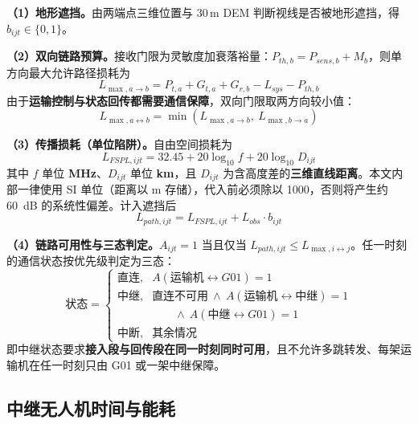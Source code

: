 \textbf{（1）地形遮挡。}由两端点三维位置与 30\,m DEM 判断视线是否被地形遮挡，得 $b_{ijt}\in\{0,1\}$。

\textbf{（2）双向链路预算。}接收门限为灵敏度加衰落裕量：$P_{th,b}=P_{sens,b}+M_{b}$，则单方向最大允许路径损耗为
\begin{equation}
	L_{\max,a\to b}=P_{t,a}+G_{t,a}+G_{r,b}-L_{sys}-P_{th,b}
\end{equation}
由于\textbf{运输控制与状态回传都需要通信保障}，双向门限取两方向较小值：
\begin{equation}
	L_{\max,a\leftrightarrow b}=\min\left(L_{\max,a\to b},\ L_{\max,b\to a}\right)
	\label{eq:bidir}
\end{equation}

\textbf{（3）传播损耗（单位陷阱）。}自由空间损耗为
\begin{equation}
	L_{FSPL,ijt}=32.45+20\log_{10}f+20\log_{10}D_{ijt}
	\label{eq:fspl}
\end{equation}
其中 $f$ 单位 \textbf{MHz}、$D_{ijt}$ 单位 \textbf{km}，且 $D_{ijt}$ 为含高度差的\textbf{三维直线距离}。本文内部一律使用 SI 单位（距离以 m 存储），代入前必须除以 1000，否则将产生约 \SI{60}{dB} 的系统性偏差。计入遮挡后
\begin{equation}
	L_{path,ijt}=L_{FSPL,ijt}+L_{obs}\cdot b_{ijt}
\end{equation}

\textbf{（4）链路可用性与三态判定。}$A_{ijt}=1$ 当且仅当 $L_{path,ijt}\le L_{\max,i\leftrightarrow j}$。任一时刻的通信状态按优先级判定为三态：
\begin{equation}
	\text{状态}=
	\begin{cases}
		\text{直连}, & A(\text{运输机}\leftrightarrow G01)=1\\
		\text{中继}, & \text{直连不可用}\ \wedge\ A(\text{运输机}\leftrightarrow\text{中继})=1\\
		            & \qquad\wedge\ A(\text{中继}\leftrightarrow G01)=1\\
		\text{中断}, & \text{其余情况}
	\end{cases}
	\label{eq:tristate}
\end{equation}
即中继状态要求\textbf{接入段与回传段在同一时刻同时可用}，且不允许多跳转发、每架运输机在任一时刻只由 G01 或一架中继保障。

\subsection{中继无人机时间与能耗}

